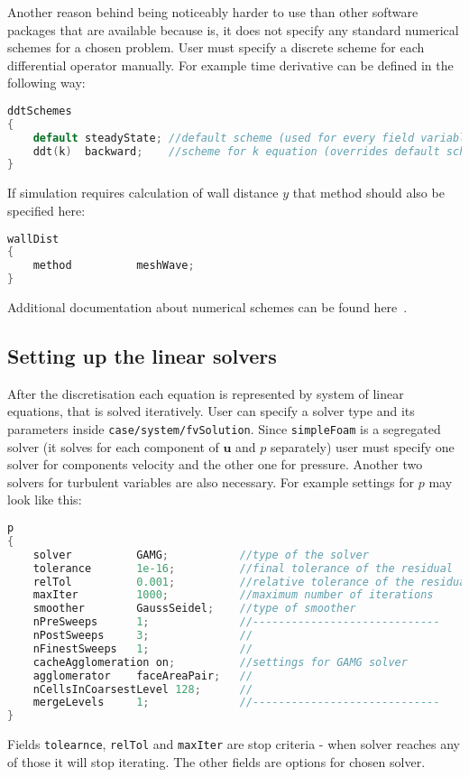             Another reason behind \oFoam being noticeably harder to use than other software packages that are available because is, it does not specify any standard numerical schemes for a chosen problem.
            User must specify a discrete scheme for each differential operator manually.
            For example time derivative can be defined in the following way:
            \begin{lstlisting}[language=C++]
ddtSchemes
{
    default steadyState; //default scheme (used for every field variable)
    ddt(k)  backward;    //scheme for k equation (overrides default scheme)
}
            \end{lstlisting}
            If simulation requires calculation of wall distance $y$ that method should also be specified here:
            \begin{lstlisting}[language=C++]
wallDist
{
    method          meshWave;
}
            \end{lstlisting}
            Additional documentation about numerical schemes can be found here~\cite{fvSchemes}.
        \subsection{Setting up the linear solvers}
            After the discretisation each equation is represented by system of linear equations, that is solved iteratively. User can specify a solver type and its parameters inside \texttt{case/system/fvSolution}. Since \texttt{simpleFoam} is a segregated solver (it solves for each component of $\bm{u}$ and $p$ separately) user must specify one solver for components velocity and the other one for pressure. Another two solvers for turbulent variables are also necessary. For example settings for $p$ may look like this:
            \begin{lstlisting}[language=C++]
p
{
    solver          GAMG;           //type of the solver
    tolerance       1e-16;          //final tolerance of the residual
    relTol          0.001;          //relative tolerance of the residual
    maxIter         1000;           //maximum number of iterations
    smoother        GaussSeidel;    //type of smoother
    nPreSweeps      1;              //-----------------------------
    nPostSweeps     3;              //
    nFinestSweeps   1;              //
    cacheAgglomeration on;          //settings for GAMG solver
    agglomerator    faceAreaPair;   //
    nCellsInCoarsestLevel 128;      //
    mergeLevels     1;              //-----------------------------
}
            \end{lstlisting}
            Fields \lstinline[language=C++]{tolearnce}, \lstinline[language=C++]{relTol} and \lstinline[language=C++]{maxIter} are stop criteria - when solver reaches any of those it will stop iterating. The other fields are options for chosen solver.
            
